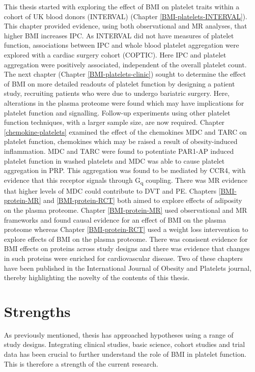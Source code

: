 \documentclass[11pt,twoside]{bristolthesis}
\begin{document}
This thesis started with exploring the effect of BMI on platelet traits within a cohort of UK blood donors (INTERVAL) (Chapter \ref{BMI-platelets-INTERVAL}). This chapter provided evidence, using both observational and MR analyses, that higher BMI increases IPC. As INTERVAL did not have measures of platelet function, associations between IPC and whole blood platelet aggregation were explored with a cardiac surgery cohort (COPTIC). Here IPC and platelet aggregation were positively associated, independent of the overall platelet count. The next chapter (Chapter \ref{BMI-platelets-clinic}) sought to determine the effect of BMI on more detailed readouts of platelet function by designing a patient study, recruiting patients who were due to undergo bariatric surgery. Here, alterations in the plasma proteome were found which may have implications for platelet function and signalling. Follow-up experiments using other platelet function techniques, with a larger sample size, are now required. Chapter \ref{chemokine-platelets} examined the effect of the chemokines MDC and TARC on platelet function, chemokines which may be raised a result of obesity-induced inflammation. MDC and TARC were found to potentiate PAR1-AP induced platelet function in washed platelets and MDC was able to cause platelet aggregation in PRP. This aggregation was found to be mediated by CCR4, with evidence that this receptor signals through G\textsubscript{q} coupling. There was MR evidence that higher levels of MDC could contribute to DVT and PE. Chapters \ref{BMI-protein-MR} and \ref{BMI-protein-RCT} both aimed to explore effects of adiposity on the plasma proteome. Chapter \ref{BMI-protein-MR} used observational and MR frameworks and found causal evidence for an effect of BMI on the plasma proteome whereas Chapter \ref{BMI-protein-RCT} used a weight loss intervention to explore effects of BMI on the plasma proteome. There was consisent evidence for BMI effects on proteins across study designs and there was evidence that changes in such proteins were enriched for cardiovascular disease. Two of these chapters have been published in the International Journal of Obesity and Platelets journal, thereby highlighting the novelty of the contents of this thesis.

\hypertarget{strengths}{%
\section{Strengths}\label{strengths}}

As previously mentioned, thesis has approached hypotheses using a range of study designs. Integrating clinical studies, basic science, cohort studies and trial data has been crucial to further understand the role of BMI in platelet function. This is therefore a strength of the current research.
\end{document}
